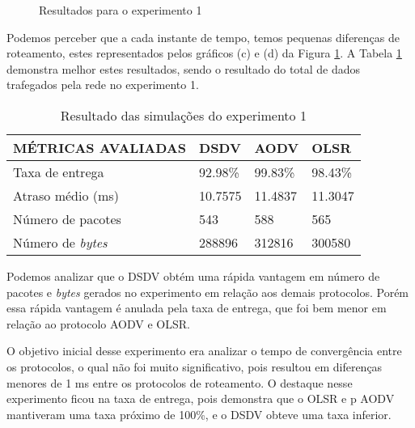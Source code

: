 \begin{figure}[H]
	\centering
	\label{subfig:exp1Lost}
	\label{subfig:exp1Late}
	\label{subfig:exp1Byte}
	\label{subfig:exp1Pkts}
	
	\caption{Resultados para o experimento 1}
	\label{fig:resulExp1}
\end{figure}

Podemos perceber que a cada instante de tempo, temos pequenas diferen\c{c}as de roteamento, estes representados pelos gr\'aficos (c) e (d) da Figura \ref{fig:resulExp1}. A Tabela \ref{tabExp1Result} demonstra melhor estes resultados, sendo o resultado do total de dados trafegados pela rede no experimento 1.

\begin{table}[H]
	\centering
	\caption{Resultado das simula\c{c}\~oes do experimento 1}
	\begin{tabular}{ | l | l | l | l | }
		\hline
		M\'ETRICAS AVALIADAS & DSDV & AODV & OLSR \\ \hline
		Taxa de entrega & 92.98\% & 99.83\% & 98.43\% \\ \hline
		Atraso m\'edio (ms) & 10.7575 & 11.4837 & 11.3047 \\ \hline
		N\'umero de pacotes & 543 & 588 & 565 \\ \hline
		N\'umero de \textit{bytes} & 288896 & 312816 & 300580 \\ \hline
	\end{tabular}
	\label{tabExp1Result}
\end{table}

Podemos analizar que o DSDV obt\'em uma r\'apida vantagem em n\'umero de pacotes e \textit{bytes} gerados no experimento em rela\c{c}\~ao aos demais protocolos. Por\'em essa r\'apida vantagem \'e anulada pela taxa de entrega, que foi bem menor em rela\c{c}\~ao ao protocolo AODV e OLSR.

O objetivo inicial desse experimento era analizar o tempo de converg\^encia entre os protocolos, o qual n\~ao foi muito significativo, pois resultou em diferen\c{c}as menores de 1 ms entre os protocolos de roteamento. 
O destaque nesse experimento ficou na taxa de entrega, pois demonstra que o OLSR e p AODV mantiveram uma taxa pr\'oximo de 100\%, e o DSDV obteve uma taxa inferior.

